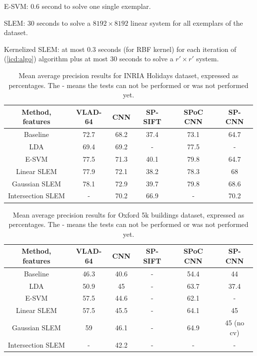 E-SVM: $0.6$ second to solve one single exemplar.

SLEM: $30$ seconds to solve a $8192\times 8192$ linear system for all exemplars of the dataset.

Kernelized SLEM: at most $0.3$ seconds (for RBF kernel) for each iteration of (\ref{icd:algo}) algorithm plus at most $30$ seconds to solve a $r'\times r'$ system.

\begin{table}[t]
\begin{center}
\begin{tabular}{|c|c|c|c|c|c|}
\hline
Method, features & VLAD-64 \cite{VLAD}& CNN \cite{jia2014caffe} & SP-SIFT \cite{spk} & SPoC CNN \cite{babenko15} &  SP-CNN \cite{SPPCNN} \\
\hline\hline
Baseline            & 72.7 & 68.2 & 37.4 & 73.1 & 64.7\\
LDA                 & 69.4 & 69.2 & -    & 77.5 & -\\
E-SVM               & 77.5 & 71.3 & 40.1 & 79.8 & 64.7 \\
Linear SLEM         & 77.9 & 72.1 & 38.2 & 78.3 & 68 \\
Gaussian SLEM       & 78.1 & 72.9 & 39.7 & 79.8 & 68.6 \\
Intersection SLEM   & -    & 70.2 & 66.9 & -    & 70.2 \\
\hline
\end{tabular}
\end{center}
\caption{Mean average precision results for INRIA Holidays dataset, expressed as percentages. The - means the tests can not be performed or was not performed yet.}
\end{table}


\begin{table}[t]
\begin{center}
\begin{tabular}{|c|c|c|c|c|c|}
\hline
Method, features & VLAD-64 \cite{VLAD}& CNN \cite{jia2014caffe} & SP-SIFT \cite{spk} & SPoC CNN \cite{babenko15} &  SP-CNN \cite{SPPCNN} \\
\hline\hline
Baseline            & 46.3 & 40.6 & - & 54.4 & 44 \\
LDA                 & 50.9 & 45   & - & 63.7 & 37.4\\
E-SVM               & 57.5 & 44.6 & - & 62.1 & - \\
Linear SLEM         & 57.5 & 45.5 & - & 64.1 & 45 \\
Gaussian SLEM       & 59   & 46.1 & - & 64.9 & 45 (no cv) \\
Intersection SLEM   & -    & 42.2 & - & -    & - \\
\hline
\end{tabular}
\end{center}
\caption{Mean average precision results for Oxford 5k buildings dataset, expressed as percentages. The - means the tests can not be performed or was not performed yet.}
\end{table}


